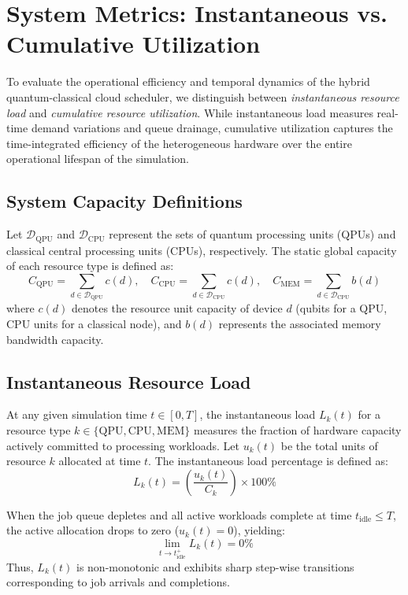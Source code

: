 \section{System Metrics: Instantaneous vs. Cumulative Utilization}
\label{sec:instant_vs_cumulative}

To evaluate the operational efficiency and temporal dynamics of the hybrid quantum-classical cloud scheduler, we distinguish between \textit{instantaneous resource load} and \textit{cumulative resource utilization}. While instantaneous load measures real-time demand variations and queue drainage, cumulative utilization captures the time-integrated efficiency of the heterogeneous hardware over the entire operational lifespan of the simulation.

\subsection{System Capacity Definitions}
Let $\mathcal{D}_{\text{QPU}}$ and $\mathcal{D}_{\text{CPU}}$ represent the sets of quantum processing units (QPUs) and classical central processing units (CPUs), respectively. The static global capacity of each resource type is defined as:
\begingroup
\small
\begin{equation}
    C_{\text{QPU}} = \sum_{d \in \mathcal{D}_{\text{QPU}}} c(d), \quad 
    C_{\text{CPU}} = \sum_{d \in \mathcal{D}_{\text{CPU}}} c(d), \quad 
    C_{\text{MEM}} = \sum_{d \in \mathcal{D}_{\text{CPU}}} b(d)
\end{equation}
\endgroup
where $c(d)$ denotes the resource unit capacity of device $d$ (qubits for a QPU, CPU units for a classical node), and $b(d)$ represents the associated memory bandwidth capacity.

\subsection{Instantaneous Resource Load}
At any given simulation time $t \in [0, T]$, the instantaneous load $L_{k}(t)$ for a resource type $k \in \{\text{QPU}, \text{CPU}, \text{MEM}\}$ measures the fraction of hardware capacity actively committed to processing workloads. Let $u_k(t)$ be the total units of resource $k$ allocated at time $t$. The instantaneous load percentage is defined as:
\begin{equation}
    L_{k}(t) = \left( \frac{u_k(t)}{C_k} \right) \times 100\%
\end{equation}

When the job queue depletes and all active workloads complete at time $t_{\text{idle}} \le T$, the active allocation drops to zero ($u_k(t) = 0$), yielding:
\begin{equation}
    \lim_{t \to t_{\text{idle}}^+} L_{k}(t) = 0\%
\end{equation}
Thus, $L_{k}(t)$ is non-monotonic and exhibits sharp step-wise transitions corresponding to job arrivals and completions.

